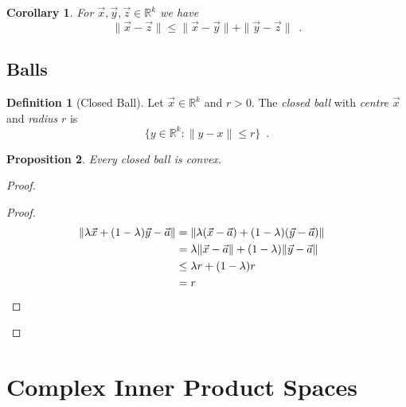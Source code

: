 \documentclass{book}
\let\qed\relax
\newtheorem{prop}{Proposition}[chapter]
\newtheorem{cor}{Corollary}[prop]
\theoremstyle{definition}
\newtheorem{df}[prop]{Definition}
\begin{document}
\begin{cor}
\label{cor:triangle_inequality}
For $\vec{x}, \vec{y}, \vec{z} \in \mathbb{R}^k$ we have
\[ \| \vec{x} - \vec{z} \| \leq \| \vec{x} - \vec{y} \| + \| \vec{y} - \vec{z} \| \enspace . \]
\end{cor}

\section{Balls}

\begin{df}[Closed Ball]
Let $\vec{x} \in \mathbb{R}^k$ and $r > 0$. The \emph{closed ball} with \emph{centre} $\vec{x}$ and \emph{radius} $r$ is
\[ \{ y \in \mathbb{R}^k : \| y - x \| \leq r \} \enspace . \]
\end{df}

\begin{prop}
Every closed ball is convex.
\end{prop}

\begin{proof}
\pf
{}
\begin{proof}
\pf
\begin{align*}
\| \lambda \vec{x} + (1 - \lambda) \vec{y} - \vec{a} \|
& = \| \lambda (\vec{x} - \vec{a}) + (1 - \lambda) (\vec{y} - \vec{a}) \| \\
& = \lambda \| \vec{x} - \vec{a} \| + (1 - \lambda) \| \vec{y} - \vec{a} \| \\
& \leq \lambda r + (1 - \lambda) r \\
& = r & \qed
\end{align*}
\end{proof}
\qed
\end{proof}

\chapter{Complex Inner Product Spaces}

\newcommand{\ket}[1]{\ensuremath{\left| {#1} \right\rangle}}
\newcommand{\bra}[1]{\ensuremath{\left\langle {#1} \right|}}
\end{document}

